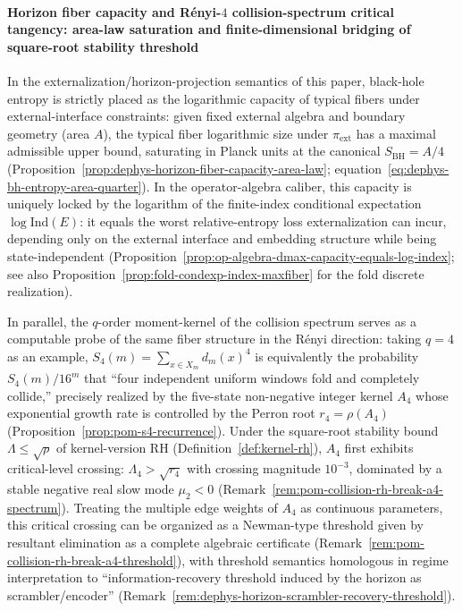 \paragraph{Horizon fiber capacity and Rényi-\texorpdfstring{$4$}{4} collision-spectrum critical tangency: area-law saturation and finite-dimensional bridging of square-root stability threshold}
In the externalization/horizon-projection semantics of this paper, black-hole entropy is strictly placed as the logarithmic capacity of typical fibers under external-interface constraints: given fixed external algebra and boundary geometry (area \(A\)), the typical fiber logarithmic size under \(\pi_{\mathrm{ext}}\) has a maximal admissible upper bound, saturating in Planck units at the canonical
\(
S_{\mathrm{BH}}=A/4
\)
(Proposition~\ref{prop:dephys-horizon-fiber-capacity-area-law}; equation~\eqref{eq:dephys-bh-entropy-area-quarter}).
In the operator-algebra caliber, this capacity is uniquely locked by the logarithm of the finite-index conditional expectation \(\log\mathrm{Ind}(E)\): it equals the worst relative-entropy loss externalization can incur, depending only on the external interface and embedding structure while being state-independent (Proposition~\ref{prop:op-algebra-dmax-capacity-equals-log-index}; see also Proposition~\ref{prop:fold-condexp-index-maxfiber} for the fold discrete realization).
\par
In parallel, the \(q\)-order moment-kernel of the collision spectrum serves as a computable probe of the same fiber structure in the Rényi direction: taking \(q=4\) as an example,
\(
S_4(m)=\sum_{x\in X_m} d_m(x)^4
\)
is equivalently the probability \(S_4(m)/16^m\) that ``four independent uniform windows fold and completely collide,'' precisely realized by the five-state non-negative integer kernel \(A_4\) whose exponential growth rate is controlled by the Perron root \(r_4=\rho(A_4)\) (Proposition~\ref{prop:pom-s4-recurrence}).
Under the square-root stability bound \(\Lambda\le \sqrt{\rho}\) of kernel-version RH (Definition~\ref{def:kernel-rh}), \(A_4\) first exhibits critical-level crossing: \(\Lambda_4>\sqrt{r_4}\) with crossing magnitude \(10^{-3}\), dominated by a stable negative real slow mode \(\mu_2<0\) (Remark~\ref{rem:pom-collision-rh-break-a4-spectrum}).
Treating the multiple edge weights of \(A_4\) as continuous parameters, this critical crossing can be organized as a Newman-type threshold given by resultant elimination as a complete algebraic certificate (Remark~\ref{rem:pom-collision-rh-break-a4-threshold}), with threshold semantics homologous in regime interpretation to ``information-recovery threshold induced by the horizon as scrambler/encoder'' (Remark~\ref{rem:dephys-horizon-scrambler-recovery-threshold}).
